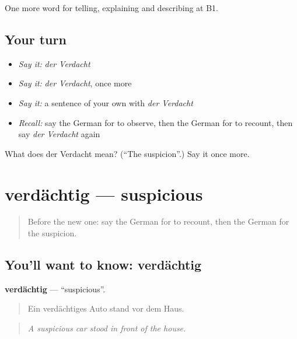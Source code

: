 \begin{grammarlens}[title={What you've built}]
One more word for telling, explaining and describing at B1.
\end{grammarlens}

\subsection*{Your turn}
\begin{itemize}
\raggedright
  \item \emph{Say it:} \emph{der Verdacht}
  \item \emph{Say it:} \emph{der Verdacht}, once more
  \item \emph{Say it:} a sentence of your own with \emph{der Verdacht}
  \item \emph{Recall:} say the German for to observe, then the German for to recount, then say \emph{der Verdacht} again
\end{itemize}

\begin{tcolorbox}[breakable,colback=teal!4,colframe=teal!35!black,title={Before you move on}]
What does der Verdacht mean? (\textquotedblleft{}The suspicion\textquotedblright{}.) Say it once more.
\end{tcolorbox}
\section[verdächtig]{verdächtig — suspicious}

\label{lesson:GE-C284-verdaechtig}



\begin{quote}
Before the new one: say the German for to recount, then the German for the suspicion.
\end{quote}

\subsection*{You'll want to know: verdächtig}
\textbf{verdächtig} — \textquotedblleft{}suspicious\textquotedblright{}.

\begin{quote}
Ein verdächtiges Auto stand vor dem Haus.
\end{quote}

\begin{quote}
\emph{A suspicious car stood in front of the house.}
\end{quote}

